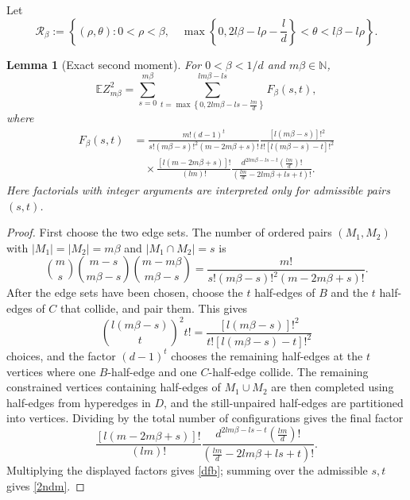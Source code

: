 \documentclass[11pt]{amsart}
\theoremstyle{plain}
\newtheorem{lemma}[theorem]{Lemma}
\numberwithin{equation}{section}
\numberwithin{theorem}{section}
\numberwithin{figure}{section}
\begin{document}
Let
\begin{equation}
\mathcal R_\beta:=\left\{(\rho,\theta):0<\rho<\beta,
\quad \max\left\{0,2l\beta-l\rho-\frac{l}{d}\right\}<\theta<l\beta-l\rho\right\}.
\label{drb}
\end{equation}

\begin{lemma}[Exact second moment]\label{lem:second-exact}
For $0<\beta<1/d$ and $m\beta\in\mathbb N$,
\begin{equation}
\mathbb E Z_{m\beta}^2=
\sum_{s=0}^{m\beta}\sum_{t=\max\left\{0,2lm\beta-ls-\frac{lm}{d}\right\}}^{lm\beta-ls}
F_\beta(s,t),\label{2ndm}
\end{equation}
where
\begin{equation}\label{dfb}
\begin{aligned}
F_\beta(s,t)
&=\frac{m!(d-1)^t}{s!(m\beta-s)!^2(m-2m\beta+s)!}
\frac{[l(m\beta-s)]!^2}{t![l(m\beta-s)-t]!^2}\\
&\quad \times
\frac{[l(m-2m\beta+s)]!}{(lm)!}
\frac{d^{2lm\beta-ls-t}\left(\frac{lm}{d}\right)!}
{\left(\frac{lm}{d}-2lm\beta+ls+t\right)!}.
\end{aligned}
\end{equation}
Here factorials with integer arguments are interpreted only for admissible pairs $(s,t)$.
\end{lemma}

\begin{proof}
First choose the two edge sets.  The number of ordered pairs $(M_1,M_2)$ with
$|M_1|=|M_2|=m\beta$ and $|M_1\cap M_2|=s$ is
\[
\binom ms\binom{m-s}{m\beta-s}\binom{m-m\beta}{m\beta-s}
=\frac{m!}{s!(m\beta-s)!^2(m-2m\beta+s)!}.
\]
After the edge sets have been chosen, choose the $t$ half-edges of $B$ and the $t$
half-edges of $C$ that collide, and pair them.  This gives
\[
\binom{l(m\beta-s)}t^2t!
=\frac{[l(m\beta-s)]!^2}{t![l(m\beta-s)-t]!^2}
\]
choices, and the factor $(d-1)^t$ chooses the remaining half-edges at the $t$ vertices
where one $B$-half-edge and one $C$-half-edge collide.  The remaining constrained
vertices containing half-edges of $M_1\cup M_2$ are then completed using half-edges from
hyperedges in $D$, and the still-unpaired half-edges are partitioned into vertices.  Dividing
by the total number of configurations gives the final factor
\[
\frac{[l(m-2m\beta+s)]!}{(lm)!}
\frac{d^{2lm\beta-ls-t}\left(\frac{lm}{d}\right)!}
{\left(\frac{lm}{d}-2lm\beta+ls+t\right)!}.
\]
Multiplying the displayed factors gives \eqref{dfb}; summing over the admissible $s,t$
gives \eqref{2ndm}.
\end{proof}
\end{document}
